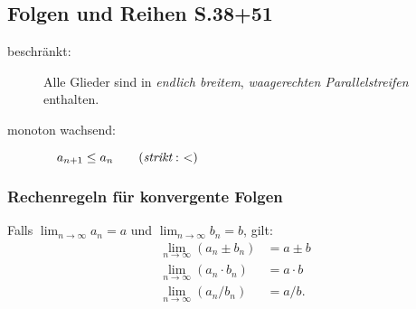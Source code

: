 \subsection{Folgen und Reihen \texorpdfstring{\hfill S.38+51}{S.38+51}}  
    \begin{description}
        \item[beschränkt:] Alle Glieder sind in \emph{endlich breitem}, \emph{waagerechten Parallelstreifen} enthalten.
        \item[monoton wachsend:] $\quad a_{n+1} \leq a_n \qquad  (\emph{strikt}:\,\, <)$
    \end{description}
    \subsubsection{Rechenregeln für konvergente Folgen}
        Falls $\displaystyle \lim_{n\to \infty} a_n = a$ und $\displaystyle \lim_{n\to \infty} b_n = b$, gilt:
        \begin{align*}
            \lim_{n \to \infty}(a_n \pm b_n) &= a \pm b\\
            \lim_{n \to \infty}(a_n \cdot b_n) &= a \cdot b\\
            \lim_{n \to \infty}(a_n / b_n) &= a / b.
        \end{align*}
